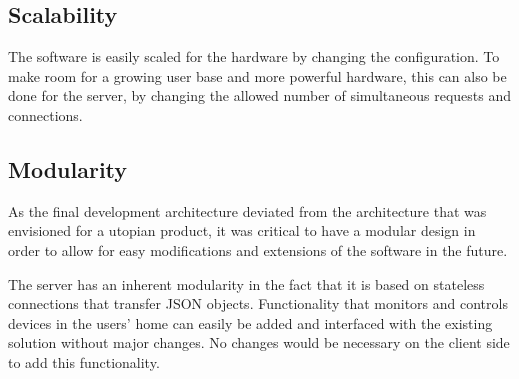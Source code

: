 \subsection{Scalability}
The software is easily scaled for the hardware by changing the configuration.  To make room for a growing user base and more powerful hardware, this can also be done for the server, by changing the allowed number of simultaneous requests and connections.


\subsection{Modularity}
\label{sec:modularity}
As the final development architecture deviated from the architecture that was envisioned for a utopian product, it was critical to have a modular design in order to allow for easy modifications and extensions of the software in the future. 

The server has an inherent modularity in the fact that it is based on stateless connections that transfer JSON objects. Functionality that monitors and controls devices in the users' home can easily be added and interfaced with the existing solution without major changes. No changes would be necessary on the client side to add this functionality.